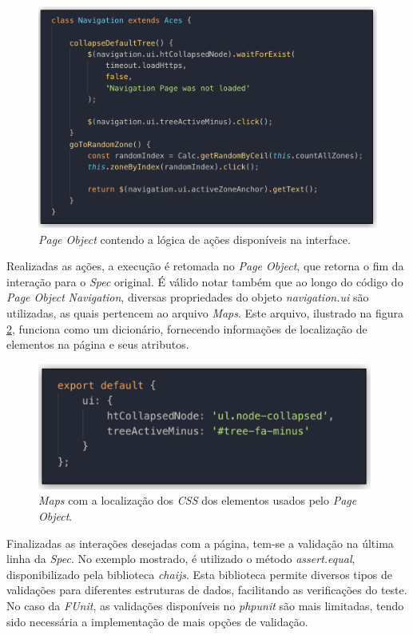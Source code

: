 \begin{figure}[H]
    \centering
    \includegraphics[width=14.5cm]{source/4-solucao/images/fate-page-object.png}
    \caption{\emph{Page Object} contendo a lógica de ações disponíveis na interface.}
    \label{fig:fate-page-object}
\end{figure}

Realizadas as ações, a execução é retomada no \emph{Page Object}, que retorna o fim da interação para o \emph{Spec} original. É válido notar também que ao longo do código do \emph{Page Object} \emph{Navigation}, diversas propriedades do objeto \emph{navigation.ui} são utilizadas, as quais pertencem ao arquivo \emph{Maps}. Este arquivo, ilustrado na figura \ref{fig:fate-maps}, funciona como um dicionário, fornecendo informações de localização de elementos na página e seus atributos.

\begin{figure}[H]
    \centering
    \includegraphics[width=11cm]{source/4-solucao/images/fate-maps.png}
    \caption{\emph{Maps} com a localização dos \emph{CSS} dos elementos usados pelo \emph{Page Object}.}
    \label{fig:fate-maps}
\end{figure}

Finalizadas as interações desejadas com a página, tem-se a validação na última linha da \emph{Spec}. No exemplo mostrado, é utilizado o método \emph{assert.equal}, disponibilizado pela biblioteca \emph{chaijs}. Esta biblioteca permite diversos tipos de validações para diferentes estruturas de dados, facilitando as verificações do teste. No caso da \emph{FUnit}, as validações disponíveis no \emph{phpunit} são mais limitadas, tendo sido necessária a implementação de mais opções de validação.

